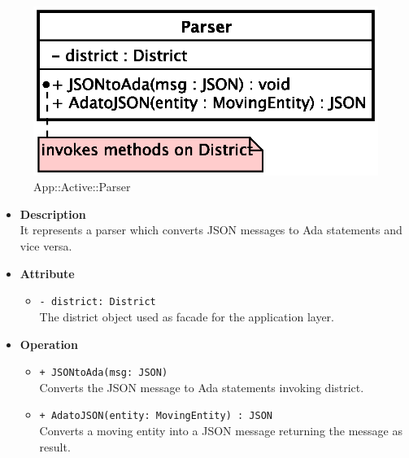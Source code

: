 \begin{figure}[h]
\centering
\includegraphics[scale=0.6,keepaspectratio]{images/solution/parser.eps}
\caption{App::Active::Parser}
\label{fig:sd-app-parser}
\end{figure}
\FloatBarrier
\begin{itemize}
  \item \textbf{Description} \\
    It represents a parser which converts JSON messages to Ada statements and vice versa.
  \item \textbf{Attribute}
  \begin{itemize}
    \item \texttt{- district: District} \\
The district object used as facade for the application layer.
  \end{itemize}
  \item \textbf{Operation}
  \begin{itemize} 
    \item \texttt{+ JSONtoAda(msg: JSON)} \\
Converts the JSON message to Ada statements invoking district.
    \item \texttt{+ AdatoJSON(entity: MovingEntity) : JSON} \\
Converts a moving entity into a JSON message returning the message as result.
  \end{itemize}
\end{itemize}
